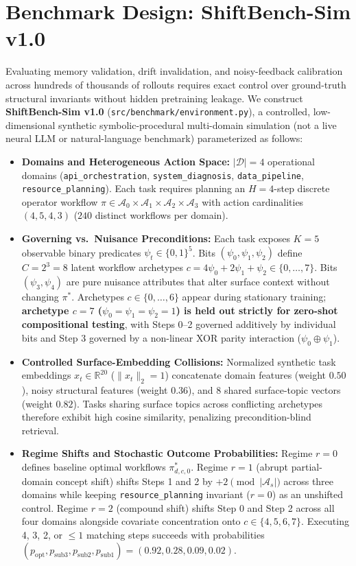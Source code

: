 \documentclass[10pt,letterpaper]{article}
\begin{document}
\section{Benchmark Design: ShiftBench-Sim v1.0}
Evaluating memory validation, drift invalidation, and noisy-feedback calibration across hundreds of thousands of rollouts requires exact control over ground-truth structural invariants without hidden pretraining leakage. We construct \textbf{ShiftBench-Sim v1.0} (\texttt{src/benchmark/environment.py}), a controlled, low-dimensional synthetic symbolic-procedural multi-domain simulation (not a live neural LLM or natural-language benchmark) parameterized as follows:
\begin{itemize}
  \item \textbf{Domains and Heterogeneous Action Space:} $|\mathcal{D}| = 4$ operational domains (\texttt{api\_orchestration}, \texttt{system\_diagnosis}, \texttt{data\_pipeline}, \texttt{resource\_planning}). Each task requires planning an $H=4$-step discrete operator workflow $\pi \in \mathcal{A}_0 \times \mathcal{A}_1 \times \mathcal{A}_2 \times \mathcal{A}_3$ with action cardinalities $(4, 5, 4, 3)$ ($240$ distinct workflows per domain).
  \item \textbf{Governing vs.\ Nuisance Preconditions:} Each task exposes $K=5$ observable binary predicates $\psi_t \in \{0,1\}^5$. Bits $(\psi_0, \psi_1, \psi_2)$ define $C = 2^3 = 8$ latent workflow archetypes $c = 4\psi_0 + 2\psi_1 + \psi_2 \in \{0,\dots,7\}$. Bits $(\psi_3, \psi_4)$ are pure nuisance attributes that alter surface context without changing $\pi^*$. Archetypes $c \in \{0,\dots,6\}$ appear during stationary training; \textbf{archetype $c=7$ ($\psi_0=\psi_1=\psi_2=1$) is held out strictly for zero-shot compositional testing}, with Steps 0--2 governed additively by individual bits and Step 3 governed by a non-linear XOR parity interaction ($\psi_0 \oplus \psi_1$).
  \item \textbf{Controlled Surface-Embedding Collisions:} Normalized synthetic task embeddings $x_t \in \mathbb{R}^{20}$ ($\|x_t\|_2=1$) concatenate domain features (weight $0.50$), noisy structural features (weight $0.36$), and 8 shared surface-topic vectors (weight $0.82$). Tasks sharing surface topics across conflicting archetypes therefore exhibit high cosine similarity, penalizing precondition-blind retrieval.
  \item \textbf{Regime Shifts and Stochastic Outcome Probabilities:} Regime $r=0$ defines baseline optimal workflows $\pi^*_{d,c,0}$. Regime $r=1$ (abrupt partial-domain concept shift) shifts Steps 1 and 2 by $+2 \pmod{|\mathcal{A}_s|}$ across three domains while keeping \texttt{resource\_planning} invariant ($r=0$) as an unshifted control. Regime $r=2$ (compound shift) shifts Step 0 and Step 2 across all four domains alongside covariate concentration onto $c \in \{4,5,6,7\}$. Executing 4, 3, 2, or $\le 1$ matching steps succeeds with probabilities $(p_{\mathrm{opt}}, p_{\mathrm{sub3}}, p_{\mathrm{sub2}}, p_{\mathrm{sub1}}) = (0.92, 0.28, 0.09, 0.02)$.

\end{itemize}
\end{document}
